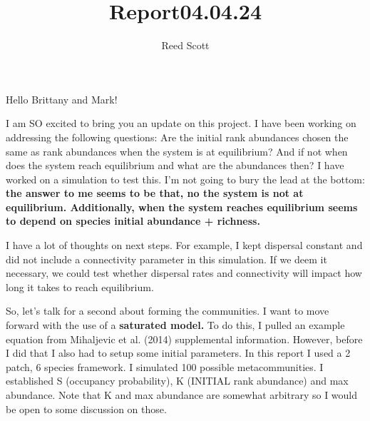 \documentclass[
  letterpaper,
  DIV=11,
  numbers=noendperiod]{scrartcl}
\title{Report04.04.24}
\author{Reed Scott}
\date{}
\begin{document}
\maketitle


Hello Brittany and Mark!

I am SO excited to bring you an update on this project. I have been
working on addressing the following questions: Are the initial rank
abundances chosen the same as rank abundances when the system is at
equilibrium? And if not when does the system reach equilibrium and what
are the abundances then? I have worked on a simulation to test this. I'm
not going to bury the lead at the bottom: \textbf{the answer to me seems
to be that, no the system is not at equilibrium. Additionally, when the
system reaches equilibrium seems to depend on species initial abundance
+ richness.}

I have a lot of thoughts on next steps. For example, I kept dispersal
constant and did not include a connectivity parameter in this
simulation. If we deem it necessary, we could test whether dispersal
rates and connectivity will impact how long it takes to reach
equilibrium.

So, let's talk for a second about forming the communities. I want to
move forward with the use of a \textbf{saturated model.} To do this, I
pulled an example equation from Mihaljevic et al. (2014) supplemental
information. However, before I did that I also had to setup some initial
parameters. In this report I used a 2 patch, 6 species framework. I
simulated 100 possible metacommunities. I established S (occupancy
probability), K (INITIAL rank abundance) and max abundance. Note that K
and max abundance are somewhat arbitrary so I would be open to some
discussion on those.
\end{document}
